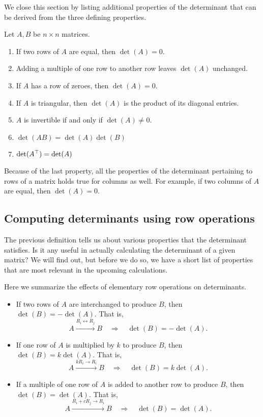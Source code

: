 \documentclass{ximera}
\begin{document}
We close this section by listing additional properties of the
determinant that can be derived from the three defining properties.

\begin{theorem}
  Let $A, B$ be $n \times n$ matrices.
  \begin{enumerate}
  \item If two rows of $A$ are equal, then $\det (A) = 0$.
  \item Adding a multiple of one row to another row leaves $\det (A)$
    unchanged.
  \item If $A$ has a row of zeroes, then $\det (A) = 0$.
  \item If $A$ is triangular, then $\det (A)$ is the product of its
    diagonal entries.
  \item $A$ is invertible if and only if $\det (A) \neq 0$.
  \item $\det (AB) = \det(A) \det(B)$
  \item $\det (A^\top) = \det(A)$
  \end{enumerate}
\end{theorem}

Because of the last property, all the properties of the determinant
pertaining to rows of a matrix holds true for columns as well. For
example, if two columns of $A$ are equal, then $\det(A) = 0$.


\subsection{Computing determinants using row operations}

The previous definition tells us about various properties that the
determinant satisfies. Is it any useful in actually calculating the
determinant of a given matrix? We will find out, but before we do so,
we have a short list of properties that are most relevant in the
upcoming calculations.

\begin{concept}
  Here we summarize the effects of elementary row operations on
  determinants.
  \begin{itemize}
  \item If two rows of $A$ are interchanged to produce $B$, then
    $\det(B) = -\det(A)$. That is,
    \[
      A \xrightarrow{R_i \leftrightarrow R_j} B
      \quad\Longrightarrow\quad
      \det(B) = -\det(A).
    \]
  \item If one row of $A$ is multiplied by $k$ to produce $B$, then
    $\det(B) = k \det(A)$. That is,
    \[
      A \xrightarrow{k R_i \to R_i} B
      \quad\Longrightarrow\quad
      \det(B) = k\det(A).
    \]
  \item If a multiple of one row of $A$ is added to another row to
    produce $B$, then $\det(B) = \det(A)$. That is,
    \[
      A \xrightarrow{R_i + c R_j \to R_i} B
      \quad\Longrightarrow\quad
      \det(B) = \det(A).
    \]
  \end{itemize}
\end{concept}
\end{document}
